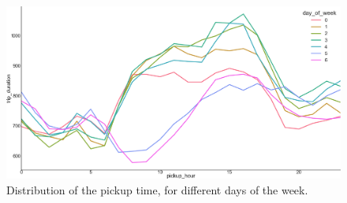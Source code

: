 \documentclass[a4paper]{article}
\begin{document}
\begin{figure}
    \centering
    \includegraphics[width=\linewidth]{pickup_hour_vs_trip_duration}
    \caption{Distribution of the pickup time, for different days of the week.}
    \label{pickup_hour}
\end{figure}
\end{document}
